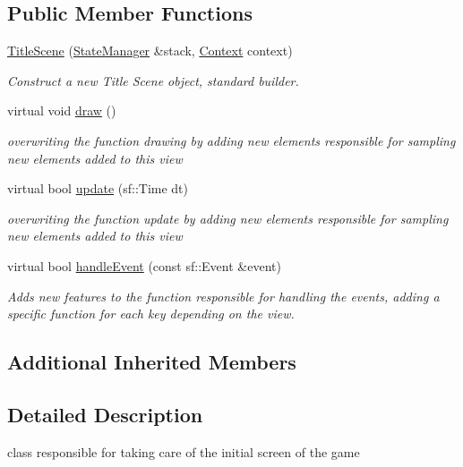 \subsection*{Public Member Functions}
\begin{DoxyCompactItemize}
\item 
\hyperlink{classTitleScene_a2542c8d7f2bcd75f69d79ec96cf75859}{Title\+Scene} (\hyperlink{classStateManager}{State\+Manager} \&stack, \hyperlink{structState_1_1Context}{Context} context)
\begin{DoxyCompactList}\small\item\em Construct a new Title Scene object, standard builder. \end{DoxyCompactList}\item 
\mbox{\label{classTitleScene_af9939b69acd5a381b53678f022928110}} 
virtual void \hyperlink{classTitleScene_af9939b69acd5a381b53678f022928110}{draw} ()
\begin{DoxyCompactList}\small\item\em overwriting the function drawing by adding new elements responsible for sampling new elements added to this view \end{DoxyCompactList}\item 
virtual bool \hyperlink{classTitleScene_a7da09182894a7a48a12ed0e170e5b5f3}{update} (sf\+::\+Time dt)
\begin{DoxyCompactList}\small\item\em overwriting the function update by adding new elements responsible for sampling new elements added to this view \end{DoxyCompactList}\item 
virtual bool \hyperlink{classTitleScene_ae965e4a6c1435246fcbdd487bbc58468}{handle\+Event} (const sf\+::\+Event \&event)
\begin{DoxyCompactList}\small\item\em Adds new features to the function responsible for handling the events, adding a specific function for each key depending on the view. \end{DoxyCompactList}\end{DoxyCompactItemize}
\subsection*{Additional Inherited Members}


\subsection{Detailed Description}
class responsible for taking care of the initial screen of the game 

